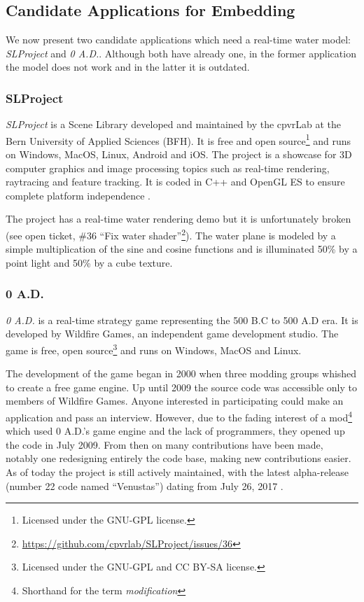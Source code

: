 
\subsection{Candidate Applications for Embedding}\label{subsec:candidate_apps}

We now present two candidate applications which need a real-time water model:
\textit{SLProject} and \textit{0 A.D.}. Although both have already one,
in the former application the model does not work and in the latter it is
outdated.


\subsubsection{SLProject}

\textit{SLProject} is a Scene Library developed and maintained by the cpvrLab at
the Bern University of Applied Sciences (BFH). It is free and open
source\footnote{Licensed under the GNU-GPL license.} and runs on Windows, MacOS,
Linux, Android and iOS\@. The project is a showcase for 3D computer graphics and
image processing topics such as real-time rendering, raytracing and feature
tracking. It is coded in C++ and OpenGL ES to ensure complete platform
independence \autocite{hudritch2017slproject, slproject2017doxygen}.

The project has a real-time water rendering demo but it is unfortunately broken
(see open ticket, \#36 ``Fix water
shader''\footnote{\url{https://github.com/cpvrlab/SLProject/issues/36}}). The
water plane is modeled by a simple multiplication of the sine and cosine
functions and is illuminated 50\% by a point light and 50\% by a cube texture.


\subsubsection{0 A.D.}

\textit{0 A.D.} is a real-time strategy game representing the 500 B.C to 500 A.D
era. It is developed by Wildfire Games, an independent game development studio.
The game is free, open source\footnote{Licensed under the GNU-GPL and CC BY-SA
license.} and runs on Windows, MacOS and Linux.

The development of the game began in 2000 when three modding groups whished to
create a free game engine. Up until 2009 the source code was accessible only to
members of Wildfire Games. Anyone interested in participating could make an
application and pass an interview. However, due to the fading interest of a
mod\footnote{Shorthand for the term \textit{modification}} which used 0 A.D.'s
game engine and the lack of programmers, they opened up the code in July 2009.
From then on many contributions have been made, notably one redesigning entirely
the code base, making new contributions easier. As of today the project is still
actively maintained, with the latest alpha-release (number 22 code named
``Venustas'') dating from July 26,
2017 \autocite{wildfire0adproject,wildfire0adstory}.

